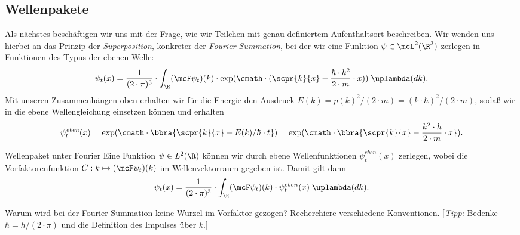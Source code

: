 \documentclass{article}
\begin{document}
    \subsection{Wellenpakete}
        Als nächstes beschäftigen wir uns mit der Frage, wie wir Teilchen mit genau definiertem Aufenthaltsort beschreiben. Wir wenden uns hierbei an das Prinzip der \emph{Superposition}, konkreter der \emph{Fourier-Summation}, bei der wir eine Funktion $\psi\in \mcL^2(\R^3)$ zerlegen in Funktionen des Typus der ebenen Welle:
        \[
            \psi_t(x) = \frac{1}{(2\cdot\pi)^3}\cdot\int_\R(\mcF\psi_t)(k)\cdot\exp(\cmath\cdot(\scpr{k}{x} - \frac{\hbar\cdot k^2}{2\cdot m}\cdot x))\;\uplambda(dk).
        \]
        Mit unseren Zusammenhängen oben erhalten wir für die Energie den Ausdruck $E(k) = p(k)^2/(2\cdot m) = (k\cdot\hbar)^2/(2\cdot m)$, sodaß wir in die ebene Wellengleichung einsetzen können und erhalten
        \[
            \psi_t^\textit{eben}(x) = \exp(\cmath\cdot\bbra{\scpr{k}{x} - E(k)/\hbar\cdot t}) = \exp(\cmath\cdot\bbra{\scpr{k}{x} - \frac{k^2\cdot\hbar}{2\cdot m}\cdot x}).
        \]
        \begin{mdef}{Wellenpaket unter Fourier}
            Eine Funktion $\psi\in L^2(\R)$ können wir durch ebene Wellenfunktionen $\psi^\textit{eben}_t(x)$ zerlegen, wobei die Vorfaktorenfunktion $C:k\mapsto (\mcF\psi_t)(k)$ im Wellenvektorraum gegeben ist. Damit gilt dann
            \[
                \psi_t(x) = \frac{1}{(2\cdot\pi)^3}\cdot\int_\R(\mcF\psi_t)(k)\cdot\psi^{eben}_t(x)\;\uplambda(dk).
            \]
        \end{mdef}

        \begin{Aufgabe}
            \nr{} Warum wird bei der Fourier-Summation keine Wurzel im Vorfaktor gezogen? Recherchiere verschiedene Konventionen. [\textit{Tipp:} Bedenke $\hbar = h/(2\cdot \pi)$ und die Definition des Impulses über $k$.]
        \end{Aufgabe}
\end{document}
